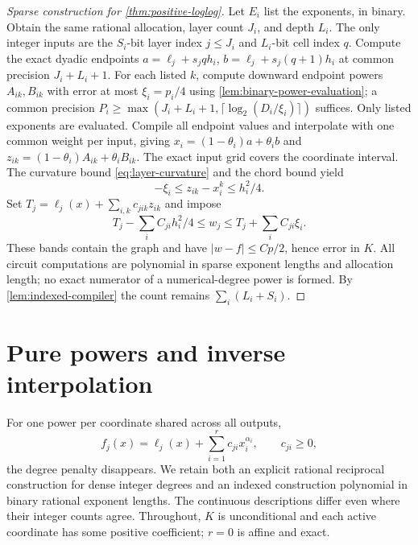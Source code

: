 \begin{proof}[Sparse construction for \cref{thm:positive-loglog}]
Let $E_i$ list the exponents, in binary. Obtain the same rational
allocation, layer count $J_i$, and depth $L_i$. The only integer inputs
are the $S_i$-bit layer index $j\le J_i$ and $L_i$-bit cell index $q$.
Compute the exact dyadic endpoints
$a=\ell_j+s_jqh_i$, $b=\ell_j+s_j(q+1)h_i$ at common precision
$J_i+L_i+1$. For each listed $k$, compute downward endpoint powers
$A_{ik},B_{ik}$ with error at most $\xi_i=p_i/4$ using
\cref{lem:binary-power-evaluation}; a common precision
$P_i\ge\max(J_i+L_i+1,\lceil\log_2(D_i/\xi_i)\rceil)$ suffices.
Only listed exponents are evaluated. Compile all endpoint values and
interpolate with one common weight per input, giving
$x_i=(1-\theta_i)a+\theta_i b$ and
$z_{ik}=(1-\theta_i)A_{ik}+\theta_i B_{ik}$.
The exact input grid covers the coordinate interval. The curvature
bound \eqref{eq:layer-curvature} and the chord bound yield
\[
 -\xi_i\le z_{ik}-x_i^k\le h_i^2/4.
\]
Set $T_j=\ell_j(x)+\sum_{i,k}c_{jik}z_{ik}$ and impose
\begin{equation}\label{eq:sparse-polynomial-band}
 T_j-\sum_iC_{ji}h_i^2/4\le w_j
 \le T_j+\sum_iC_{ji}\xi_i.
\end{equation}
These bands contain the graph and have
$|w-f|\le Cp/2$, hence error in $K$. All circuit computations are
polynomial in sparse exponent lengths and allocation length; no exact
numerator of a numerical-degree power is formed. By
\cref{lem:indexed-compiler} the count remains $\sum_i(L_i+S_i)$.
\end{proof}

\section{Pure powers and inverse interpolation}\label{sec:pure-powers}

For one power per coordinate shared across all outputs,
\begin{equation}\label{eq:pure-power-system}
 f_j(x)=\ell_j(x)+\sum_{i=1}^r c_{ji}x_i^{\alpha_i},
 \qquad c_{ji}\ge0,
\end{equation}
the degree penalty disappears. We retain both an explicit rational
reciprocal construction for dense integer degrees and an indexed
construction polynomial in binary rational exponent lengths. The
continuous descriptions differ even where their integer counts agree.
Throughout, $K$ is unconditional and each active coordinate has some
positive coefficient; $r=0$ is affine and exact.

